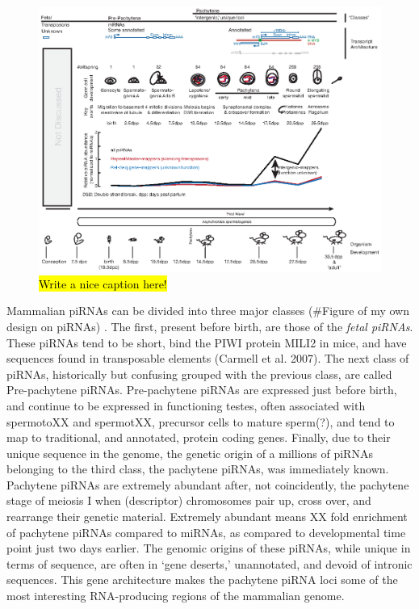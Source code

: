 \begin{figure}[htbp]
	\centering 
	\includegraphics{Figures/Chapter1/MammalianPiRNAClassesOverTime.eps}
	\caption[Different Classes of mammalian piRNAs]
	{
		\hl{Write a nice caption here!}
	}
	\label{fig:Mammalian piRNA classes}
\end{figure}

Mammalian piRNAs can be divided into three major classes (\#Figure of my own design on piRNAs) \citep{Kuramochi-Miyagawa2008}. The first, present before birth, are those of the \textit{fetal piRNAs}. These piRNAs tend to be short, bind the PIWI protein MILI2 in mice, and have sequences found in transposable elements (Carmell et al. 2007). The next class of piRNAs, historically but confusing grouped with the previous class, are called Pre-pachytene piRNAs. Pre-pachytene piRNAs are expressed just before birth, and continue to be expressed in functioning testes, often associated with spermotoXX and spermotXX, precursor cells to mature sperm(?), and tend to map to traditional, and annotated, protein coding genes. Finally, due to their unique sequence in the genome, the genetic origin of a millions of piRNAs belonging to the third class, the pachytene piRNAs, was immediately known. Pachytene piRNAs are extremely abundant after, not coincidently, the pachytene stage of meiosis I when (descriptor) chromosomes pair up, cross over, and rearrange their genetic material. Extremely abundant means XX fold enrichment of pachytene piRNAs compared to miRNAs, as compared to developmental time point just two days earlier. The genomic origins of these piRNAs, while unique in terms of sequence, are often in ‘gene deserts,’ unannotated, and devoid of intronic sequences. This gene architecture makes the pachytene piRNA loci some of the most interesting RNA-producing regions of the mammalian genome.
 
